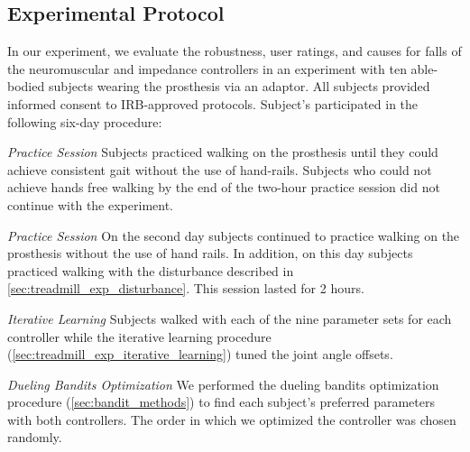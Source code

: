 \subsection{Experimental Protocol}

In our experiment, we evaluate the robustness, user ratings, and causes for
falls of the neuromuscular and impedance controllers in an experiment with ten
able-bodied subjects wearing the prosthesis via an adaptor. All subjects
provided informed consent to IRB-approved protocols. Subject's participated in
the following six-day procedure:


\begin{days}
    \item\label{list:exp_day_1} \emph{Practice Session} Subjects practiced
    walking on the prosthesis until they could achieve consistent gait without
    the use of hand-rails. Subjects who could not achieve hands free walking by
    the end of the two-hour practice session did not continue with the
    experiment.

    \item\label{list:exp_day_2} \emph{Practice Session} On the second day
    subjects continued to practice walking on the prosthesis without the use of
    hand rails. In addition, on this day subjects practiced walking with the
    disturbance described in \cref{sec:treadmill_exp_disturbance}. This session
    lasted for 2 hours.

    \item\label{list:exp_day_3} \emph{Iterative Learning} Subjects walked with
    each of the nine parameter sets for each controller while the iterative
    learning procedure (\cref{sec:treadmill_exp_iterative_learning}) tuned the
    joint angle offsets. 

    \item\label{list:exp_day_4} \emph{Dueling Bandits Optimization} We performed
    the dueling bandits optimization procedure (\cref{sec:bandit_methods}) to
    find each subject's preferred parameters with both controllers. The order in
    which we optimized the controller was chosen randomly.


\end{days}
